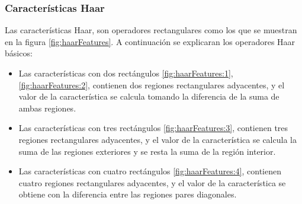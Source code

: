 \subsubsection{Características Haar}\label{sssec:CaracteristicasHaar}  

Las características Haar, son operadores rectangulares como los que se muestran en la figura \ref{fig:haarFeatures}. A continuación se explicaran los operadores Haar básicos:
\begin{itemize}
\item Las características con dos rectángulos \ref{fig:haarFeatures:1}, \ref{fig:haarFeatures:2}, contienen dos regiones rectangulares adyacentes, y el valor de la característica se calcula tomando la diferencia de la suma de ambas regiones. 

\item Las características con tres rectángulos \ref{fig:haarFeatures:3}, contienen tres regiones rectangulares adyacentes, y el valor de la característica se calcula la suma de las regiones exteriores y se resta la suma de la región interior.

\item Las características con cuatro rectángulos \ref{fig:haarFeatures:4}, contienen cuatro regiones rectangulares adyacentes, y el valor de la característica se obtiene con la diferencia entre las regiones pares diagonales.
\end{itemize} 

